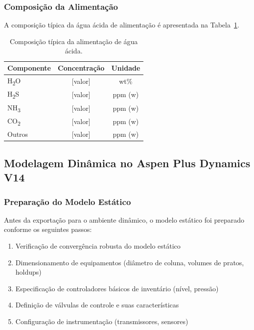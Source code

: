 
\subsubsection{Composição da Alimentação}

A composição típica da água ácida de alimentação é apresentada na Tabela~\ref{tab:composicao_feed}.

\begin{table}[H]
  \centering
  \caption{Composição típica da alimentação de água ácida.}
  \label{tab:composicao_feed}
  \begin{tabular}{lcc}
    \toprule
    \textbf{Componente} & \textbf{Concentração} & \textbf{Unidade} \\
    \midrule
    H\textsubscript{2}O & [valor] & wt\% \\
    H\textsubscript{2}S & [valor] & ppm (w) \\
    NH\textsubscript{3} & [valor] & ppm (w) \\
    CO\textsubscript{2} & [valor] & ppm (w) \\
    Outros & [valor] & ppm (w) \\
    \bottomrule
  \end{tabular}
\end{table}




\subsection{Modelagem Dinâmica no Aspen Plus Dynamics V14}\label{sec:modelo_dinamico}

\subsubsection{Preparação do Modelo Estático}

Antes da exportação para o ambiente dinâmico, o modelo estático foi preparado conforme os seguintes passos:

\begin{enumerate}
  \item Verificação de convergência robusta do modelo estático
  \item Dimensionamento de equipamentos (diâmetro de coluna, volumes de pratos, holdups)
  \item Especificação de controladores básicos de inventário (nível, pressão)
  \item Definição de válvulas de controle e suas características
  \item Configuração de instrumentação (transmissores, sensores)
\end{enumerate}

